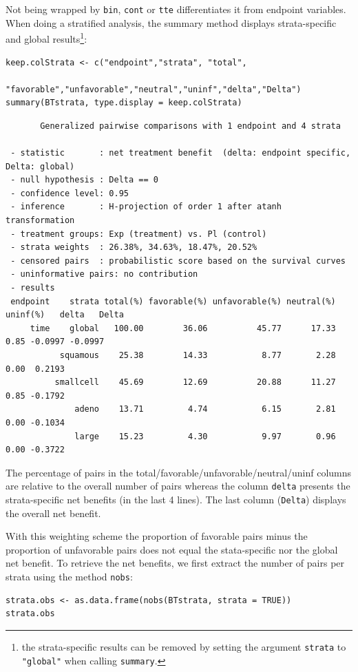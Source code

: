 \documentclass[12pt]{article}
\newcommand\Warning[1][3ex]{%
\renewcommand\stacktype{L}%
\scaleto{\stackon[1.3pt]{\color{red}$\triangle$}{\tiny\bfseries !}}{#1}%
\xspace
}
\begin{document}
Not being wrapped by \texttt{bin}, \texttt{cont} or \texttt{tte} differentiates it from
endpoint variables. When doing a stratified analysis, the summary method
displays strata-specific and global results\footnote{the strata-specific
results can be removed by setting the argument \texttt{strata} to \texttt{"global"}
when calling \texttt{summary}.}:
\lstset{language=r,label= ,caption= ,captionpos=b,numbers=none}
\begin{lstlisting}
keep.colStrata <- c("endpoint","strata", "total",
                    "favorable","unfavorable","neutral","uninf","delta","Delta")
summary(BTstrata, type.display = keep.colStrata)
\end{lstlisting}

\begin{verbatim}
       Generalized pairwise comparisons with 1 endpoint and 4 strata

 - statistic       : net treatment benefit  (delta: endpoint specific, Delta: global) 
 - null hypothesis : Delta == 0 
 - confidence level: 0.95 
 - inference       : H-projection of order 1 after atanh transformation 
 - treatment groups: Exp (treatment) vs. Pl (control) 
 - strata weights  : 26.38%, 34.63%, 18.47%, 20.52% 
 - censored pairs  : probabilistic score based on the survival curves
 - uninformative pairs: no contribution
 - results
 endpoint    strata total(%) favorable(%) unfavorable(%) neutral(%) uninf(%)   delta   Delta
     time    global   100.00        36.06          45.77      17.33     0.85 -0.0997 -0.0997
           squamous    25.38        14.33           8.77       2.28     0.00  0.2193        
          smallcell    45.69        12.69          20.88      11.27     0.85 -0.1792        
              adeno    13.71         4.74           6.15       2.81     0.00 -0.1034        
              large    15.23         4.30           9.97       0.96     0.00 -0.3722
\end{verbatim}


The percentage of pairs in the
total/favorable/unfavorable/neutral/uninf columns are relative to the
overall number of pairs whereas the column \texttt{delta} presents the
strata-specific net benefits (in the last 4 lines). The last column
(\texttt{Delta}) displays the overall net benefit.

\bigskip

\Warning With this weighting scheme the proportion of favorable pairs
minus the proportion of unfavorable pairs does not equal the
stata-specific nor the global net benefit. To retrieve the net
benefits, we first extract the number of pairs per strata using the
method \texttt{nobs}:
\lstset{language=r,label= ,caption= ,captionpos=b,numbers=none}
\begin{lstlisting}
strata.obs <- as.data.frame(nobs(BTstrata, strata = TRUE))
strata.obs
\end{lstlisting}
\end{document}
